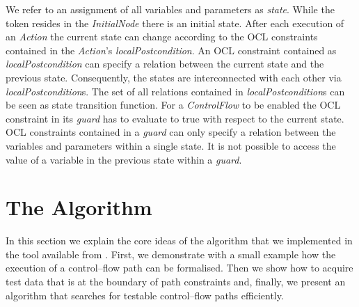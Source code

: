 \documentclass[runningheads,a4paper]{llncs}%
\newcommand{\UMLType}[1]{\textsf{\textit{#1}}} %
\newcommand{\UMLReference}[1]{\textsf{\textit{#1}}} %
\begin{document}
We refer to an assignment of all variables and parameters as \emph{state}. While the token resides in the \UMLType{InitialNode} there is an initial state. After each execution of an \UMLType{Action} the current state can change according to the OCL constraints contained in the \UMLType{Action}'s \UMLReference{localPostcondition}. An OCL constraint contained as \UMLType{localPostcondition} can specify a relation between the current state and the previous state. Consequently, the states are interconnected with each other via \UMLReference{localPostcondition}s. The set of all relations contained in \UMLType{localPostcondition}s can be seen as state transition function. For a \UMLType{ControlFlow} to be enabled the OCL constraint in its \UMLReference{guard} has to evaluate to true with respect to the current state. OCL constraints contained in a \UMLReference{guard} can only specify a relation between the variables and parameters within a single state. It is not possible to access the value of a variable in the previous state within a \UMLReference{guard}.%
\section{The Algorithm}%
\label{sec:Algorithm}%
In this section we explain the core ideas of the algorithm that we implemented in the tool available from \cite{PartegWebsite}. First, we demonstrate with a small example how the execution of a control--flow path can be formalised. Then we show how to acquire test data that is at the boundary of path constraints and, finally, we present an algorithm that searches for testable control--flow paths efficiently.%
\end{document}
